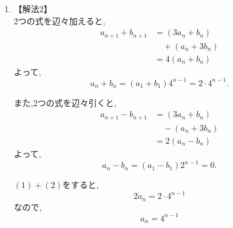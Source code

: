 \begin{enumerate}[label=(\arabic*),parsep=3pt,format=\bookitemlink{example-system-1}{solution}{problem}]
\begin{enumerate}
                  2式を辺々加えると,
                  \[
                    2a_n=2\cdot4^{n-1}
                  \]
                  であるから,
                  \[
                    a_n=4^{n-1}
                  \]
                  また,
                  \[
                    b_n=a_n=4^{n-1}
                  \]
            \item 【解法2】\\
                  2つの式を辺々加えると,
                  \begin{align*}
                    a_{n+1}+b_{n+1}
                      &=(3a_n+b_n)\\
                      &\quad +(a_n+3b_n)\\
                      &=4(a_n+b_n)
                  \end{align*}
                  よって,
                  \[
                    a_n+b_n=(a_1+b_1)4^{n-1}=2\cdot4^{n-1}. \tag*{\(\cdots\) (1)}
                  \]

                  また,2つの式を辺々引くと,
                  \begin{align*}
                    a_{n+1}-b_{n+1}
                      &=(3a_n+b_n)\\
                      &\quad -(a_n+3b_n)\\
                      &=2(a_n-b_n)
                  \end{align*}
                  よって,
                  \[
                    a_n-b_n=(a_1-b_1)2^{n-1}=0. \tag*{\(\cdots\) (2)}
                  \]

                  \((1)+(2)\)をすると,
                  \[
                    2a_n=2\cdot4^{n-1}
                  \]
                  なので,
                  \[
                    a_n=4^{n-1}
                  \]


\end{enumerate}
\end{enumerate}

